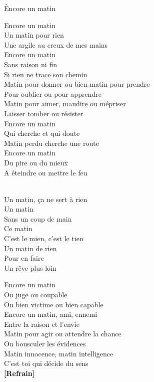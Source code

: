 \documentclass{novel}
\begin{document}
\newpage
\large
\h*{Encore un matin}
\begin{multicols}{2}
Encore un matin \\
Un matin pour rien \\
Une argile au creux de mes mains \\
Encore un matin \\
Sans raison ni fin \\
Si rien ne trace son chemin \\

Matin pour donner ou bien matin pour prendre \\
Pour oublier ou pour apprendre \\
Matin pour aimer, maudire ou mépriser \\
Laisser tomber ou résister \\

Encore un matin \\
Qui cherche et qui doute \\
Matin perdu cherche une route \\
Encore un matin \\
Du pire ou du mieux \\
A éteindre ou mettre le feu \\
\columnbreak

\begin{bfseries}
[Refrain:]\\
Un matin, ça ne sert à rien \\
Un matin \\
Sans un coup de main \\
Ce matin \\
C'est le mien, c'est le tien \\
Un matin de rien \\
Pour en faire \\
Un rêve plus loin \\
\end{bfseries}

Encore un matin \\
Ou juge ou coupable \\
Ou bien victime ou bien capable \\
Encore un matin, ami, ennemi \\
Entre la raison et l'envie \\
Matin pour agir ou attendre la chance \\
Ou bousculer les évidences \\
Matin innocence, matin intelligence \\
C'est toi qui décide du sens \\

\textbf{[Refrain]}
\end{multicols}
\end{document}
